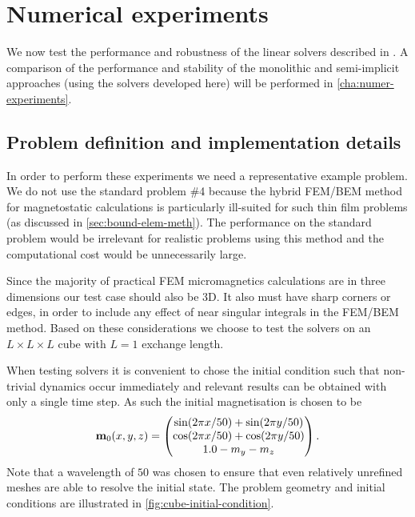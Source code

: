 \section{Numerical experiments}
\label{sec:numer-exper-fem-bem-systems}


We now test the performance and robustness of the linear solvers described in .
A comparison of the performance and stability of the monolithic and semi-implicit approaches (using the solvers developed here) will be performed in \cref{cha:numer-experiments}.


\subsection{Problem definition and implementation details}

In order to perform these experiments we need a representative example problem.
We do not use the \mumag standard problem \#4 because the hybrid FEM/BEM method for magnetostatic calculations is particularly ill-suited for such thin film problems (as discussed in \cref{sec:bound-elem-meth}).
The performance on the standard problem would be irrelevant for realistic problems using this method and the computational cost would be unnecessarily large.

Since the majority of practical FEM micromagnetics calculations are in three dimensions our test case should also be 3D.
It also must have sharp corners or edges, in order to include any effect of near singular integrals in the FEM/BEM method.
Based on these considerations we choose to test the solvers on an $L\times L \times L$ cube with $L=1$ exchange length.

When testing solvers it is convenient to chose the initial condition such that non-trivial dynamics occur immediately and relevant results can be obtained with only a single time step.
As such the initial magnetisation is chosen to be
\begin{equation}
  \boldsymbol{\mathrm{m}}_0(x, y, z) = \begin{pmatrix} \sin(2\pi x/50) + \sin(2\pi y/50) \\ \cos(2\pi x/50) + \cos(2 \pi y/50) \\ 1.0 - m_y - m_z \end{pmatrix}.
\end{equation}
Note that a wavelength of $50$ was chosen to ensure that even relatively unrefined meshes are able to resolve the initial state.
The problem geometry and initial conditions are illustrated in \cref{fig:cube-initial-condition}.

